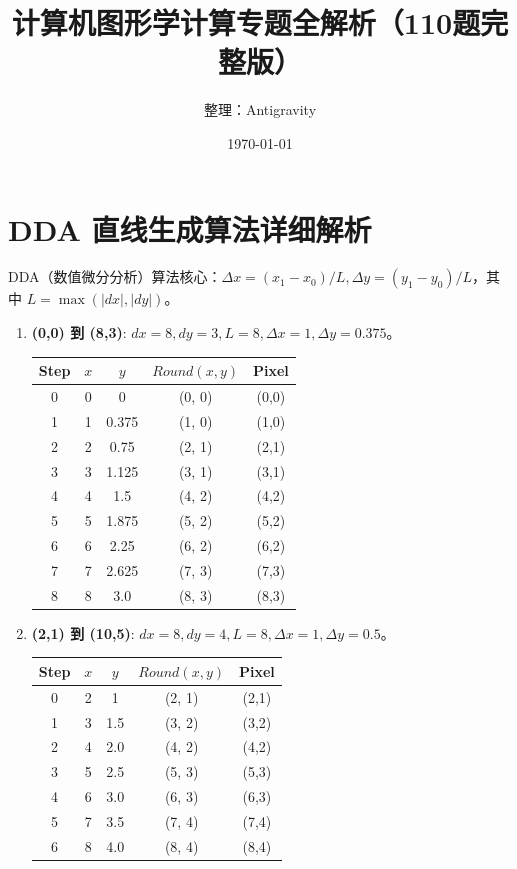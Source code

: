 \documentclass[UTF8]{ctexart}
\title{计算机图形学计算专题全解析（110题完整版）}
\author{整理：Antigravity}
\date{\today}
\begin{document}
\maketitle

\section{DDA 直线生成算法详细解析}
DDA（数值微分分析）算法核心：$\Delta x = (x_1-x_0)/L, \Delta y = (y_1-y_0)/L$，其中 $L = \max(|dx|, |dy|)$。

\begin{enumerate}
    \item \textbf{(0,0) 到 (8,3)}: $dx=8, dy=3, L=8, \Delta x=1, \Delta y=0.375$。
    \begin{center}
    \begin{tabular}{ccccc}
    \toprule Step & $x$ & $y$ & $Round(x,y)$ & Pixel \\ \midrule
    0 & 0 & 0 & (0, 0) & (0,0) \\
    1 & 1 & 0.375 & (1, 0) & (1,0) \\ 2 & 2 & 0.75 & (2, 1) & (2,1) \\
    3 & 3 & 1.125 & (3, 1) & (3,1) \\ 4 & 4 & 1.5 & (4, 2) & (4,2) \\
    5 & 5 & 1.875 & (5, 2) & (5,2) \\ 6 & 6 & 2.25 & (6, 2) & (6,2) \\
    7 & 7 & 2.625 & (7, 3) & (7,3) \\ 8 & 8 & 3.0 & (8, 3) & (8,3) \\ \bottomrule
    \end{tabular}
    \end{center}
    \item \textbf{(2,1) 到 (10,5)}: $dx=8, dy=4, L=8, \Delta x=1, \Delta y=0.5$。
    \begin{center}
    \begin{tabular}{ccccc}
    \toprule Step & $x$ & $y$ & $Round(x,y)$ & Pixel \\ \midrule
    0 & 2 & 1 & (2, 1) & (2,1) \\
    1 & 3 & 1.5 & (3, 2) & (3,2) \\ 2 & 4 & 2.0 & (4, 2) & (4,2) \\
    3 & 5 & 2.5 & (5, 3) & (5,3) \\ 4 & 6 & 3.0 & (6, 3) & (6,3) \\
    5 & 7 & 3.5 & (7, 4) & (7,4) \\ 6 & 8 & 4.0 & (8, 4) & (8,4) \\

\end{tabular}
\end{center}
\end{enumerate}
\end{document}
